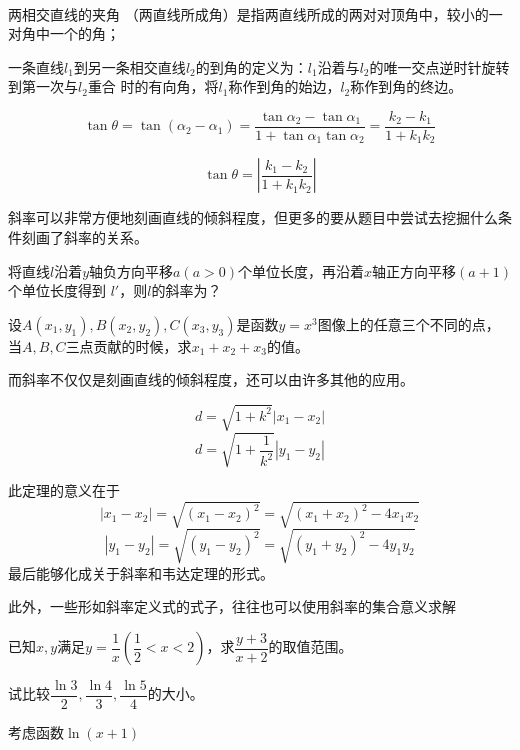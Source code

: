 \begin{definition}[夹角与到角]
    \ 

    两相交直线的夹角 （两直线所成角）是指两直线所成的两对对顶角中，较小的一对角中一个的角；

一条直线\(l_1\)到另一条相交直线\(l_2\)的到角的定义为：\(l_1\)沿着与\(l_2\)的唯一交点逆时针旋转到第一次与\(l_2\)重合
时的有向角，将\(l_1\)称作到角的始边，\(l_2\)称作到角的终边。
\end{definition}
\begin{theorem}
    \begin{equation}
        \tan \theta=\tan \left(\alpha_{2}-\alpha_{1}\right)=\frac{\tan \alpha_{2}-\tan \alpha_{1}}{1+\tan \alpha_{1} \tan \alpha_{2}}=\frac{k_{2}-k_{1}}{1+k_{1} k_{2}}
    \end{equation}
\end{theorem}
\begin{theorem}
    \begin{equation}
        \tan \theta=\left|\frac{k_{1}-k_{2}}{1+k_{1} k_{2}}\right|
    \end{equation}
\end{theorem}
斜率可以非常方便地刻画直线的倾斜程度，但更多的要从题目中尝试去挖掘什么条件刻画了斜率的关系。
\begin{example}
    将直线\(l\)沿着\(y\)轴负方向平移\(a(a>0)\)个单位长度，再沿着\(x\)轴正方向平移\((a+1)\)个单位长度得到
    \(l'\)，则\(l\)的斜率为？
\end{example}
\begin{example}
    设\(A(x_1,y_1),B(x_2,y_2),C(x_3,y_3)\)是函数\(y=x^3\)图像上的任意三个不同的点，
    当\(A,B,C\)三点贡献的时候，求\(x_1+x_2+x_3\)的值。
\end{example}
而斜率不仅仅是刻画直线的倾斜程度，还可以由许多其他的应用。
\begin{theorem}
    \begin{equation}
        d=\sqrt{1+k^2}|x_1-x_2|
    \end{equation}
    \begin{equation}
        d=\sqrt{1+\frac{1}{k^2}}|y_1-y_2|
    \end{equation}
\end{theorem}
此定理的意义在于
\[|x_1-x_2|=\sqrt{(x_1-x_2)^2}=\sqrt{(x_1+x_2)^2-4x_1x_2}\]
\[|y_1-y_2|=\sqrt{(y_1-y_2)^2}=\sqrt{(y_1+y_2)^2-4y_1y_2}\]
最后能够化成关于斜率和韦达定理的形式。

此外，一些形如斜率定义式的式子，往往也可以使用斜率的集合意义求解

\begin{example}
    已知\(x,y\)满足\(y=\dfrac{1}{x}(\dfrac{1}{2}<x<2)\)，求$\dfrac{y+3}{x+2}$的取值范围。
\end{example}
\begin{exercise}
    试比较\(\dfrac{\ln 3}{2},\dfrac{\ln 4}{3},\dfrac{\ln 5}{4}\)的大小。
\end{exercise}
\begin{hint}考虑函数\(\ln (x+1)\)
\end{hint}

